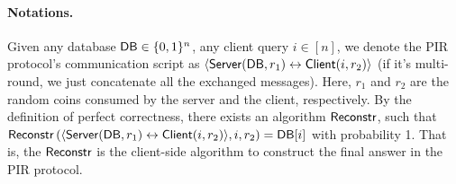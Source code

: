 
\paragraph{Notations.} Given any database ${\sf DB} \in \{0, 1\}^n$, any client query $i\in[n]$,    
we denote the PIR protocol's communication script as $\langle {\sf Server}({\sf DB}, r_1) \leftrightarrow {\sf Client}(i, r_2) \rangle$ (if it's multi-round, we just concatenate all the exchanged messages).
Here, $r_1$ and $r_2$ are the random coins consumed by the server and the client, respectively.
By the definition of perfect correctness, there exists an algorithm ${\sf Reconstr}$, such that ${\sf Reconstr}\left(\langle {\sf Server}({\sf DB}, r_1) \leftrightarrow {\sf Client}(i, r_2) \rangle, i, r_2\right)={\sf DB}[i]$ with probability 1.
That is, the ${\sf Reconstr}$ is the client-side algorithm to construct the final answer in the PIR protocol.

